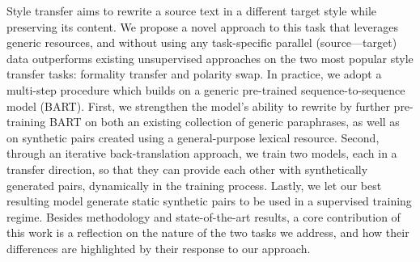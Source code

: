 Style transfer aims to rewrite a source text in a different target style while preserving its content. We propose a novel approach to this task that leverages generic resources, and without using any task-specific parallel (source---target)  data outperforms existing unsupervised approaches on the two most popular style transfer tasks: formality transfer and polarity swap. In practice, we adopt a multi-step procedure which builds on a generic pre-trained sequence-to-sequence model (BART). First, we strengthen the model's ability to rewrite by further pre-training BART on both an existing collection of generic paraphrases, as well as on synthetic pairs created using a general-purpose lexical resource. Second, through an iterative back-translation approach, we train two models, each in a transfer direction, so that they can provide each other with synthetically generated pairs, dynamically in the training process. Lastly, we let our best resulting model generate static synthetic pairs to be used in a supervised training regime. Besides methodology and state-of-the-art results, a core contribution of this work is a reflection on the nature of the two tasks we address, and how their differences are highlighted by their response to our approach.
